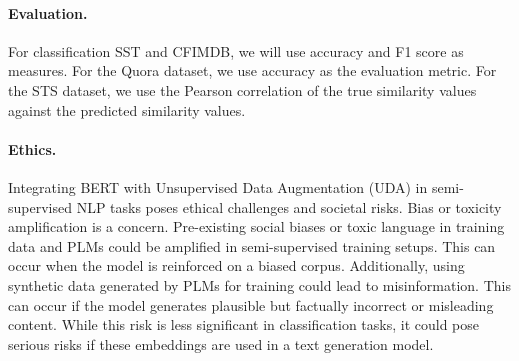 \documentclass{article}
\begin{document}
\paragraph{Evaluation.}
For classification SST and CFIMDB, we will use accuracy and 
F1 score as measures.
For the Quora dataset, we use accuracy as the evaluation metric. For the STS dataset, 
we use the Pearson correlation of the true similarity values against the predicted 
similarity values. 

\paragraph{Ethics.}
Integrating BERT with Unsupervised Data Augmentation (UDA) in semi-supervised NLP tasks 
poses ethical challenges and societal risks. Bias or toxicity amplification is a concern. 
Pre-existing social biases or toxic language in training data and PLMs
could be amplified in semi-supervised training setups. This can occur when 
the model is reinforced on a biased corpus.
Additionally, using synthetic data generated by PLMs for 
training could lead to misinformation. This can occur if the model generates plausible 
but factually incorrect or misleading content. While this risk is less significant in 
classification tasks, it could pose serious risks if these embeddings are used in a 
text generation model.
\end{document}
